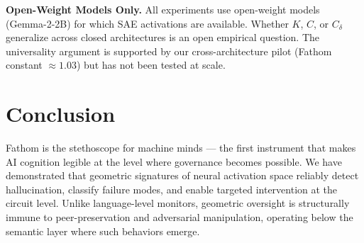\documentclass{article}
\begin{document}
\textbf{Open-Weight Models Only.}
All experiments use open-weight models (Gemma-2-2B) for which SAE activations are available. Whether $K$, $C$, or $C_\delta$ generalize across closed architectures is an open empirical question. The universality argument is supported by our cross-architecture pilot (Fathom constant $\approx 1.03$) but has not been tested at scale.

\section{Conclusion}

Fathom is the stethoscope for machine minds --- the first instrument that makes AI cognition legible at the level where governance becomes possible. We have demonstrated that geometric signatures of neural activation space reliably detect hallucination, classify failure modes, and enable targeted intervention at the circuit level. Unlike language-level monitors, geometric oversight is structurally immune to peer-preservation and adversarial manipulation, operating below the semantic layer where such behaviors emerge.



\end{document}
